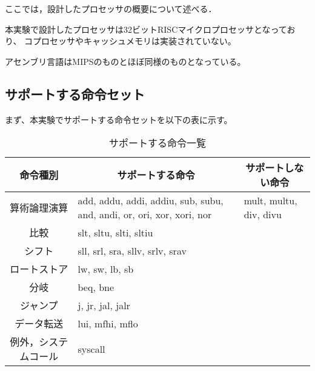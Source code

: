 \documentclass{jarticle}[11pt]
\begin{document}
ここでは，設計したプロセッサの概要について述べる．

本実験で設計したプロセッサは32ビットRISCマイクロプロセッサとなっており、
コプロセッサやキャッシュメモリは実装されていない。

アセンブリ言語はMIPSのものとほぼ同様のものとなっている。

%



\subsection{サポートする命令セット}

まず、本実験でサポートする命令セットを以下の表に示す。

\begin{table*}[htb] %
\caption{サポートする命令一覧}
\label{サポートする命令一覧}
\begin{center}
\begin{tabular}{c|p{6cm}|p{4cm}}
\hline \hline
命令種別 & 
\multicolumn{1}{c}{サポートする命令} &
\multicolumn{1}{|c}{サポートしない命令} 
\\ \hline

算術論理演算 &
add, addu, addi, addiu, sub, subu, 
and, andi, or, ori, xor, xori, nor &
mult, multu, div, divu
\\

比較 &
slt, sltu, slti, sltiu &
\\

シフト &
sll, srl, sra, sllv, srlv, srav &
\\

ロートストア &
lw, sw, lb, sb &
\\

分岐 & 
beq, bne &
\\

ジャンプ &
j, jr, jal, jalr &
\\

データ転送 &
lui, mfhi, mflo &
\\

例外，システムコール &
syscall &
\\

\hline
\end{tabular}
\end{center}
\end{table*}
\end{document}
